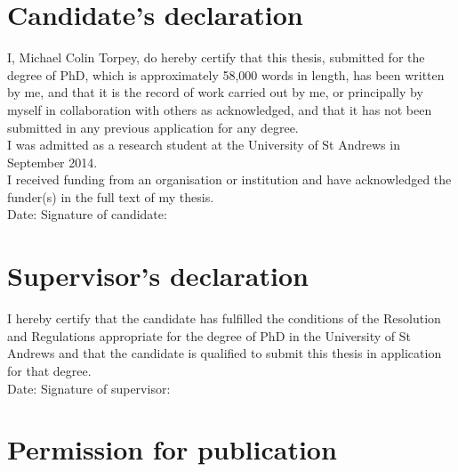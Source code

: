 

\vspace{-1.3em}
\section*{Candidate's declaration}

\noindent
I, Michael Colin Torpey, do hereby certify that this thesis, submitted for the
degree of PhD, which is approximately
58,000
words in length, has been written by me, and that it is the record of work
carried out by me, or principally by myself in collaboration with others as
acknowledged, and that it has not been submitted in any previous application for
any degree.
\\

\noindent
I was admitted as a research student at the University of St Andrews in
September 2014.
\\

\noindent
I received funding from an organisation or institution and have acknowledged the
funder(s) in the full text of my thesis.
\\

\vspace{1.0em}
\noindent
Date:\makebox[7em]{\dotfill}
Signature of candidate:\dotfill
\\

\vspace{-1.3em}
\section*{Supervisor's declaration}

\noindent
I hereby certify that the candidate has fulfilled the conditions of the
Resolution and Regulations appropriate for the degree of PhD in the University
of St Andrews and that the candidate is qualified to submit this thesis in
application for that degree.
\\

\vspace{1.0em}
\noindent
Date:\makebox[7em]{\dotfill}
Signature of supervisor:\dotfill
\\

\vspace{-1.3em}
\section*{Permission for publication}

